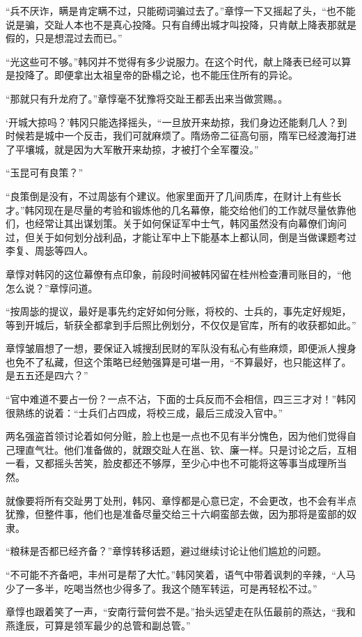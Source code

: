 “兵不厌诈，瞒是肯定瞒不过，只能砌词骗过去了。”章惇一下又摇起了头，“也不能说是骗，交趾人本也不是真心投降。只有自缚出城才叫投降，只肯献上降表那就是假的，只是想混过去而已。”

“光这些可不够。”韩冈并不觉得有多少说服力。在这个时代，献上降表已经可以算是投降了。即便拿出太祖皇帝的卧榻之论，也不能压住所有的异论。

“那就只有升龙府了。”章惇毫不犹豫将交趾王都丢出来当做赏赐。。

‘开城大掠吗？’韩冈只能选择摇头，“一旦放开来劫掠，我们身边还能剩几人？到时候若是城中一个反击，我们可就麻烦了。隋炀帝二征高句丽，隋军已经渡海打进了平壤城，就是因为大军散开来劫掠，才被打个全军覆没。”

“玉昆可有良策？”

“良策倒是没有，不过周毖有个建议。他家里面开了几间质库，在财计上有些长才。”韩冈现在是尽量的考验和锻炼他的几名幕僚，能交给他们的工作就尽量依靠他们，也经常让其出谋划策。关于如何保证军中士气，韩冈虽然没有向幕僚们询问过，但关于如何划分战利品，才能让军中上下能基本上都认同，倒是当做课题考过李复、周毖等四人。

章惇对韩冈的这位幕僚有点印象，前段时间被韩冈留在桂州检查漕司账目的，“他怎么说？”章惇问道。

“按周毖的提议，最好是事先约定好如何分账，将校的、士兵的，事先定好规矩，等到开城后，斩获全都拿到手后照比例划分，不仅仅是官库，所有的收获都如此。”

章惇皱眉想了一想，要保证入城搜刮民财的军队没有私心有些麻烦，即便派人搜身也免不了私藏，但这个策略已经勉强算是可堪一用，“不算最好，也只能这样了。是五五还是四六？”

“官中难道不要占一份？一点不沾，下面的士兵反而不会相信，四三三才对！”韩冈很熟练的说着：“士兵们占四成，将校三成，最后三成没入官中。”

两名强盗首领讨论着如何分赃，脸上也是一点也不见有半分愧色，因为他们觉得自己理直气壮。他们准备做的，就跟交趾人在邕、钦、廉一样。只是讨论之后，互相一看，又都摇头苦笑，脸皮都还不够厚，至少心中也不可能将这等事当成理所当然。

就像要将所有交趾男丁处刑，韩冈、章惇都是心意已定，不会更改，也不会有半点犹豫，但整件事，他们也是准备尽量交给三十六峒蛮部去做，因为那将是蛮部的奴隶。

“粮秣是否都已经齐备？”章惇转移话题，避过继续讨论让他们尴尬的问题。

“不可能不齐备吧，丰州可是帮了大忙。”韩冈笑着，语气中带着讽刺的辛辣，“人马少了一多半，吃喝当然也少得多了。我这个随军转运，可是再轻松不过。”

章惇也跟着笑了一声，“安南行营何尝不是。”抬头远望走在队伍最前的燕达，“我和燕逢辰，可算是领军最少的总管和副总管。”

